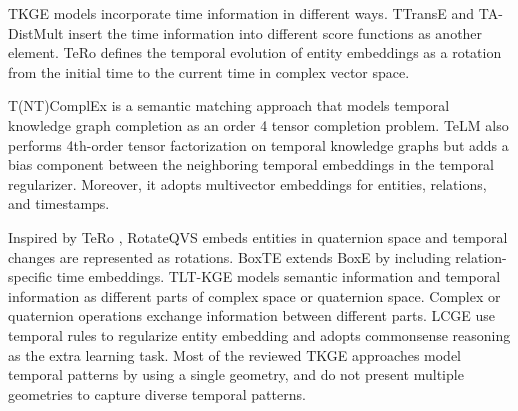 \documentclass[letterpaper]{article} %
\begin{document}


TKGE models incorporate time information in different ways.
TTransE \cite{leblay2018deriving} and TA-DistMult \cite{garcia2018learning} insert the time information into different score functions as another element.
TeRo \cite{xu2020tero} defines the temporal evolution of entity embeddings as a rotation from the initial time to the current time in complex vector space.

T(NT)ComplEx \cite{lacroix2019tensor} is a semantic matching approach that models temporal knowledge graph completion as an order 4 tensor completion problem.
TeLM \cite{xu2021temporal} also performs 4th-order tensor factorization on temporal knowledge graphs but adds a bias component between the neighboring temporal embeddings in the temporal regularizer. Moreover, it adopts multivector embeddings for entities, relations, and timestamps.

Inspired by TeRo \cite{xu2020tero}, RotateQVS \cite{chen2022rotateqvs} embeds entities in quaternion space and temporal changes are represented as rotations.
BoxTE \cite{messner2022temporal} extends BoxE \cite{abboud2020boxe} by including  relation-specific time embeddings.
TLT-KGE \cite{tltcomplexzhang2022along} models semantic information and temporal information as different parts of complex space or quaternion space. Complex or quaternion operations exchange information between different parts.
LCGE \cite{niu2022logic} use temporal rules to regularize entity embedding and adopts commonsense reasoning as the extra learning task. Most of the reviewed TKGE approaches model temporal patterns by using a single geometry, and do not present multiple geometries to capture diverse temporal patterns.
\end{document}
